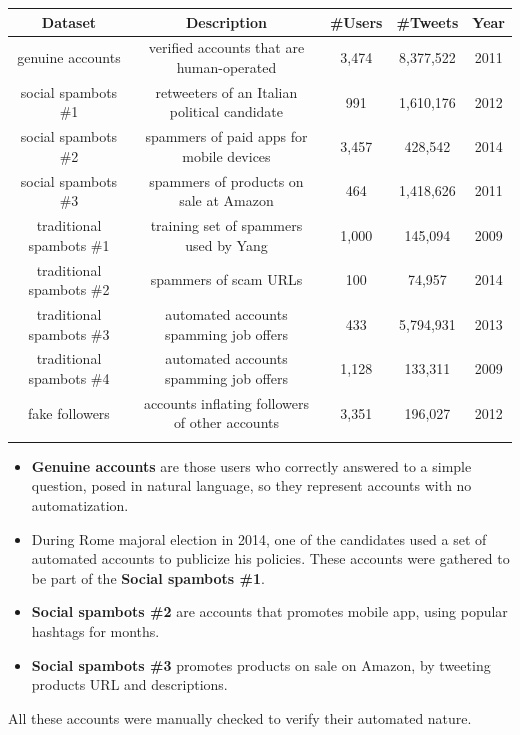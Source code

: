 \tiny
\begin{center}
\begin{tabular}{ccccc}
	Dataset&Description&\#Users&\#Tweets&Year\\ \hline\hline
	genuine accounts&
	verified accounts that are human-operated&
	3,474&
	8,377,522
	&2011\\
	social spambots \#1&
	retweeters of an Italian political candidate&
	991&
	1,610,176&
	2012 \\
	social spambots \#2&
	spammers of paid apps for mobile devices&
	3,457&
	428,542&
	2014 \\
	social spambots \#3&
	spammers of products on sale at	Amazon&
	464&
	1,418,626&
	2011 \\
	traditional spambots \#1&
	training set of spammers used by Yang\cite{Yang}&
	1,000&
	145,094&
	2009 \\
	traditional spambots \#2&
	spammers of scam URLs&
	100&
	74,957&
	2014 \\
	traditional spambots \#3&
	automated accounts spamming job offers&
	433&
	5,794,931&
	2013 \\
	traditional spambots \#4&
	automated accounts spamming job offers&
	1,128&
	133,311&
	2009 \\
	fake followers&
	accounts inflating followers of other accounts&
	3,351&
	196,027&
	2012 \\ \hline\\
	
\end{tabular}
\end{center}

\normalsize
\begin{itemize}
	\item \textbf{Genuine accounts} are those users who correctly answered to a simple question, posed in natural language, so they represent accounts with no automatization.
	\item  During Rome majoral election in 2014, one of the candidates used a set of automated accounts to publicize his policies. These accounts were gathered to be part of the \textbf{Social spambots \#1}.
	\item \textbf{Social spambots \#2} are accounts that promotes mobile app, using popular hashtags for months.
	\item  \textbf{Social spambots \#3} promotes products on sale on Amazon, by tweeting products URL and descriptions.
\end{itemize}


All these accounts were manually checked to verify their automated nature.

